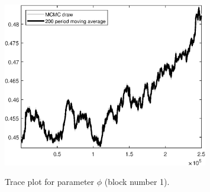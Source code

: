 \begin{figure}[H]
\centering
  \includegraphics[width=0.8\textwidth]{BRS_growth_ext_util/graphs/TracePlot_phi_blck_1}\\
    \caption{Trace plot for parameter ${\phi}$ (block number 1).}
\end{figure}
